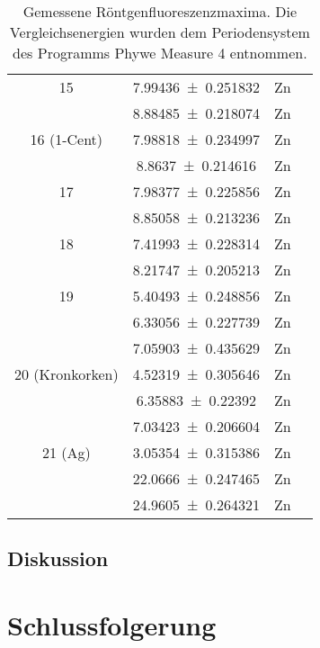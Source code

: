 \documentclass[
	a4paper,
	12pt,
	pagesize,
	ngerman
]{scrartcl}
\begin{document}
\begin{table}[H]
\begin{tabular}{ c | c || c | c }
			15 & \SI{7.99436+-0.251832}{} &Zn &  \SI{}{} \\
			& \SI{8.88485+-0.218074}{} &Zn &  \SI{}{} \\ \hline
			
			16 (1-Cent)& \SI{7.98818+-0.234997}{} &Zn &  \SI{}{} \\
			& \SI{8.8637+-0.214616}{} &Zn &  \SI{}{} \\ \hline
			
			17 & \SI{7.98377+-0.225856}{} &Zn &  \SI{}{} \\
			& \SI{8.85058+-0.213236}{} &Zn &  \SI{}{} \\ \hline
			
			18 & \SI{7.41993+-0.228314}{} &Zn &  \SI{}{} \\
			& \SI{8.21747+-0.205213}{} &Zn &  \SI{}{} \\ \hline
			
			19 & \SI{5.40493+-0.248856}{} &Zn &  \SI{}{} \\
			& \SI{6.33056+-0.227739}{} &Zn &  \SI{}{} \\
			& \SI{7.05903+-0.435629}{} &Zn &  \SI{}{} \\ \hline
			
			20 (Kronkorken) & \SI{4.52319+-0.305646}{} &Zn &  \SI{}{} \\
			& \SI{6.35883+-0.22392}{} &Zn &  \SI{}{} \\
			& \SI{7.03423+-0.206604}{} &Zn &  \SI{}{} \\ \hline
			
			21 (Ag) & \SI{3.05354+-0.315386}{} &Zn &  \SI{}{} \\
			& \SI{22.0666+-0.247465}{} &Zn &  \SI{}{} \\
			& \SI{24.9605+-0.264321}{} &Zn &  \SI{}{} \\ \hline
		\end{tabular}
		\caption{Gemessene Röntgenfluoreszenzmaxima. Die Vergleichsenergien wurden dem Periodensystem des Programms Phywe Measure 4 entnommen.}
		\label{tb_peaks_unknown} 
	\end{table}
	
	\subsection{Diskussion}
	
	\section{Schlussfolgerung}
	
\end{document}
